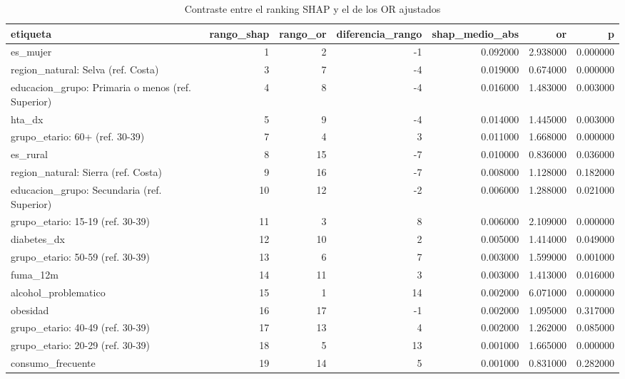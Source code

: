 \begin{table}[htbp]
\caption{Contraste entre el ranking SHAP y el de los OR ajustados}
\label{tab:tabla_30_shap_vs_or}
\begin{tabular}{lrrrrrr}
\toprule
etiqueta & rango\_shap & rango\_or & diferencia\_rango & shap\_medio\_abs & or & p \\
\midrule
es\_mujer & 1 & 2 & -1 & 0.092000 & 2.938000 & 0.000000 \\
region\_natural: Selva (ref. Costa) & 3 & 7 & -4 & 0.019000 & 0.674000 & 0.000000 \\
educacion\_grupo: Primaria o menos (ref. Superior) & 4 & 8 & -4 & 0.016000 & 1.483000 & 0.003000 \\
hta\_dx & 5 & 9 & -4 & 0.014000 & 1.445000 & 0.003000 \\
grupo\_etario: 60+ (ref. 30-39) & 7 & 4 & 3 & 0.011000 & 1.668000 & 0.000000 \\
es\_rural & 8 & 15 & -7 & 0.010000 & 0.836000 & 0.036000 \\
region\_natural: Sierra (ref. Costa) & 9 & 16 & -7 & 0.008000 & 1.128000 & 0.182000 \\
educacion\_grupo: Secundaria (ref. Superior) & 10 & 12 & -2 & 0.006000 & 1.288000 & 0.021000 \\
grupo\_etario: 15-19 (ref. 30-39) & 11 & 3 & 8 & 0.006000 & 2.109000 & 0.000000 \\
diabetes\_dx & 12 & 10 & 2 & 0.005000 & 1.414000 & 0.049000 \\
grupo\_etario: 50-59 (ref. 30-39) & 13 & 6 & 7 & 0.003000 & 1.599000 & 0.001000 \\
fuma\_12m & 14 & 11 & 3 & 0.003000 & 1.413000 & 0.016000 \\
alcohol\_problematico & 15 & 1 & 14 & 0.002000 & 6.071000 & 0.000000 \\
obesidad & 16 & 17 & -1 & 0.002000 & 1.095000 & 0.317000 \\
grupo\_etario: 40-49 (ref. 30-39) & 17 & 13 & 4 & 0.002000 & 1.262000 & 0.085000 \\
grupo\_etario: 20-29 (ref. 30-39) & 18 & 5 & 13 & 0.001000 & 1.665000 & 0.000000 \\
consumo\_frecuente & 19 & 14 & 5 & 0.001000 & 0.831000 & 0.282000 \\
\bottomrule
\end{tabular}
\end{table}
